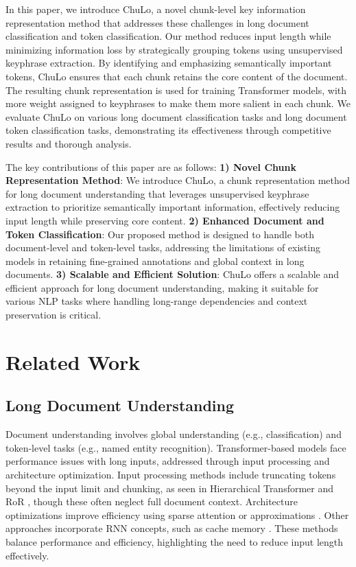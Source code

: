 \documentclass[11pt]{article}
\begin{document}
In this paper, we introduce ChuLo, a novel chunk-level key information representation method that addresses these challenges in long document classification and token classification. Our method reduces input length while minimizing information loss by strategically grouping tokens using unsupervised keyphrase extraction. By identifying and emphasizing semantically important tokens, ChuLo ensures that each chunk retains the core content of the document. The resulting chunk representation is used for training Transformer models, with more weight assigned to keyphrases to make them more salient in each chunk. We evaluate ChuLo on various long document classification tasks and long document token classification tasks, demonstrating its effectiveness through competitive results and thorough analysis.





The key contributions of this paper are as follows: 
\textbf{1) Novel Chunk Representation Method}: We introduce ChuLo, a chunk representation method for long document understanding that leverages unsupervised keyphrase extraction to prioritize semantically important information, effectively reducing input length while preserving core content.
\textbf{2) Enhanced Document and Token Classification}: Our proposed method is designed to handle both document-level and token-level tasks, addressing the limitations of existing models in retaining fine-grained annotations and global context in long documents.
\textbf{3) Scalable and Efficient Solution}: ChuLo offers a scalable and efficient approach for long document understanding, making it suitable for various NLP tasks where handling long-range dependencies and context preservation is critical.


\section{Related Work}

\subsection{Long Document Understanding}

Document understanding involves global understanding (e.g., classification) and token-level tasks (e.g., named entity recognition). Transformer-based models face performance issues with long inputs, addressed through input processing and architecture optimization. Input processing methods include truncating tokens beyond the input limit \citep{park2022efficient} and chunking, as seen in Hierarchical Transformer \citep{pappagari2019hierarchical} and RoR \citep{zhao2021ror}, though these often neglect full document context. Architecture optimizations improve efficiency using sparse attention \citep{beltagy2020longformer, zaheer2020big, roy2021efficient} or approximations \citep{peng2021random, wang2020linformer, choromanski2020masked}. Other approaches incorporate RNN concepts, such as cache memory \citep{dai2019transformer, hutchins2022block, li-etal-2023-recurrent}. These methods balance performance and efficiency, highlighting the need to reduce input length effectively.
\end{document}
